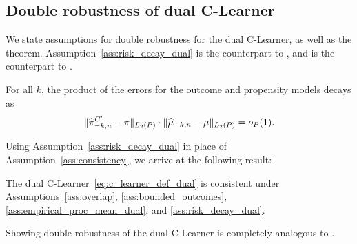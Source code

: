 \subsection{Double robustness of dual C-Learner}
\label{sec:double_robustness_dual}
We state assumptions for double robustness for the dual C-Learner, as well as the theorem. 
Assumption~\ref{ass:risk_decay_dual} is the counterpart to , and  is the counterpart to .
\begin{assumption}\label{ass:risk_decay_dual}
For all $k$, the product of the errors for the outcome and propensity
models decays as
    $$\|\widehat{\pi}^{C'}_{-k,n} - \pi\|_{L_2(P)}
    \cdot \|\widehat{\mu}_{-k,n} - \mu\|_{L_2(P)}=o_P(1).$$
\end{assumption}
Using Assumption~\ref{ass:risk_decay_dual} in place of Assumption~\ref{ass:consistency}, we arrive at the following result:
\begin{theorem}
\label{thm:dr_dual}
The dual C-Learner~\eqref{eq:c_learner_def_dual} is consistent under Assumptions~\ref{ass:overlap}, \ref{ass:bounded_outcomes}, \ref{ass:empirical_proc_mean_dual}, and 
\ref{ass:risk_decay_dual}.
\end{theorem}




Showing double robustness of the dual C-Learner is completely analogous to .

\label{sec:proofs_dual-end}
